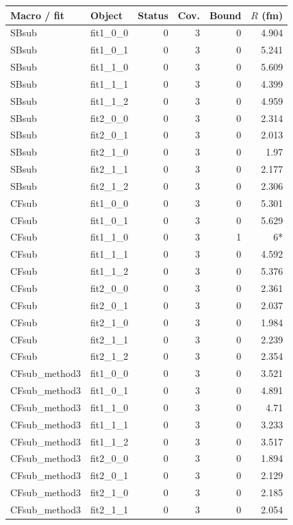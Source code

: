 \documentclass[11pt,a4paper]{article}
\begin{document}
{\scriptsize\begin{longtable}{llrrrr}\hline Macro / fit & Object & Status & Cov. & Bound & $R$ (fm)\\\hline\endhead
SBsub & fit1\_0\_0 & 0 & 3 & 0 & 4.904\\
SBsub & fit1\_0\_1 & 0 & 3 & 0 & 5.241\\
SBsub & fit1\_1\_0 & 0 & 3 & 0 & 5.609\\
SBsub & fit1\_1\_1 & 0 & 3 & 0 & 4.399\\
SBsub & fit1\_1\_2 & 0 & 3 & 0 & 4.959\\
SBsub & fit2\_0\_0 & 0 & 3 & 0 & 2.314\\
SBsub & fit2\_0\_1 & 0 & 3 & 0 & 2.013\\
SBsub & fit2\_1\_0 & 0 & 3 & 0 & 1.97\\
SBsub & fit2\_1\_1 & 0 & 3 & 0 & 2.177\\
SBsub & fit2\_1\_2 & 0 & 3 & 0 & 2.306\\
CFsub & fit1\_0\_0 & 0 & 3 & 0 & 5.301\\
CFsub & fit1\_0\_1 & 0 & 3 & 0 & 5.629\\
CFsub & fit1\_1\_0 & 0 & 3 & 1 & 6*\\
CFsub & fit1\_1\_1 & 0 & 3 & 0 & 4.592\\
CFsub & fit1\_1\_2 & 0 & 3 & 0 & 5.376\\
CFsub & fit2\_0\_0 & 0 & 3 & 0 & 2.361\\
CFsub & fit2\_0\_1 & 0 & 3 & 0 & 2.037\\
CFsub & fit2\_1\_0 & 0 & 3 & 0 & 1.984\\
CFsub & fit2\_1\_1 & 0 & 3 & 0 & 2.239\\
CFsub & fit2\_1\_2 & 0 & 3 & 0 & 2.354\\
CFsub\_method3 & fit1\_0\_0 & 0 & 3 & 0 & 3.521\\
CFsub\_method3 & fit1\_0\_1 & 0 & 3 & 0 & 4.891\\
CFsub\_method3 & fit1\_1\_0 & 0 & 3 & 0 & 4.71\\
CFsub\_method3 & fit1\_1\_1 & 0 & 3 & 0 & 3.233\\
CFsub\_method3 & fit1\_1\_2 & 0 & 3 & 0 & 3.517\\
CFsub\_method3 & fit2\_0\_0 & 0 & 3 & 0 & 1.894\\
CFsub\_method3 & fit2\_0\_1 & 0 & 3 & 0 & 2.129\\
CFsub\_method3 & fit2\_1\_0 & 0 & 3 & 0 & 2.185\\
CFsub\_method3 & fit2\_1\_1 & 0 & 3 & 0 & 2.054\\

\end{longtable}}
\end{document}
